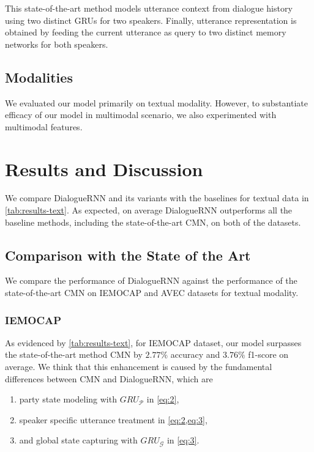 \documentclass[letterpaper]{article} %
\begin{document}
This state-of-the-art method models utterance context from dialogue history
using two distinct GRUs for two speakers. Finally, utterance representation
is obtained by feeding the current utterance as query to two distinct memory
networks for both speakers.

\subsection{Modalities}
\label{sec:exper-sett}

We evaluated our model primarily on textual modality. However, to substantiate
efficacy of our model in multimodal scenario, we also experimented with multimodal features.

\section{Results and Discussion}
\label{sec:results-discussion}

We compare DialogueRNN and its variants with the baselines for textual data in
\cref{tab:results-text}. As expected, on average DialogueRNN outperforms all the
baseline methods, including the state-of-the-art CMN, on both of the
datasets.

\subsection{Comparison with the State of the Art}

We compare the performance of DialogueRNN against the performance of the state-of-the-art 
CMN on IEMOCAP and AVEC datasets for textual modality.

\subsubsection{IEMOCAP}

As evidenced by \cref{tab:results-text}, for IEMOCAP dataset, our model surpasses
the state-of-the-art method CMN by $2.77\%$ accuracy and $3.76\%$ f1-score on average.
We think that this enhancement is caused by the fundamental differences between CMN and
DialogueRNN, which are
\begin{enumerate}
  \item party state modeling with $GRU_{\mathcal{P}}$ in \cref{eq:2},
  \item speaker specific utterance treatment in \cref{eq:2,eq:3},
  \item and global state capturing with $GRU_{\mathcal{G}}$ in \cref{eq:3}.
\end{enumerate}
\end{document}
